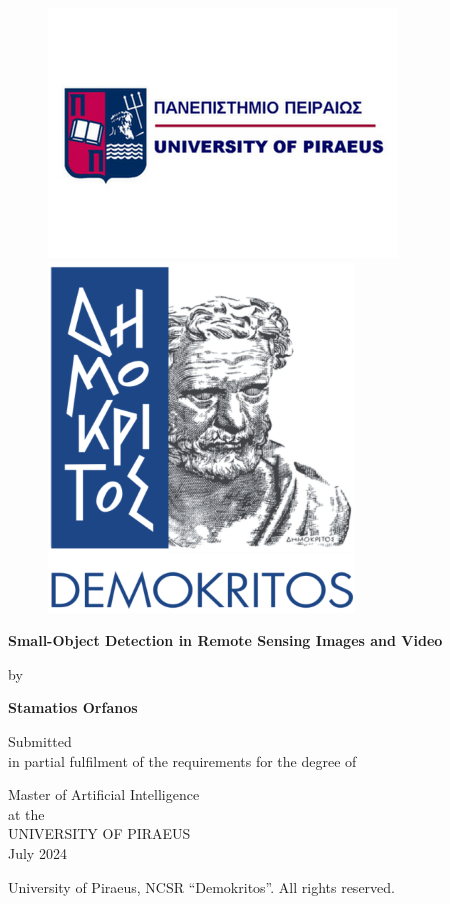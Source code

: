 \begin{titlepage}
    
    \begin{figure}[!h]
        \begin{minipage}{0.48\textwidth}
            \centering
            \includegraphics[width=0.8\linewidth]{Figures/University-of-Piraeus-logo-350x250.png}
        \end{minipage}
        \hfill
        \hfill
        \begin{minipage}{0.48\textwidth}
            \centering
            \includegraphics[width=.25\linewidth]{Figures/demokritos-logo.png}
        \end{minipage}
    \end{figure}

    \vspace{0.5in}


    \centering
    \textbf{\huge Small-Object Detection in Remote Sensing Images and Video}
    
    \vspace{0.2in}
    
    \large by

    \vspace{0.2in}

    \textbf{\Large Stamatios Orfanos}

    \vspace{0.4in}

    \large Submitted \\ in partial fulfilment of the requirements for the degree of 

    \vspace{0.2in}
    
    Master of Artificial Intelligence \\
    at the \\
    UNIVERSITY OF PIRAEUS \\
    July 2024
    
    \vspace{3.0in}
    
    \raggedright \small University of Piraeus, NCSR “Demokritos”. All rights reserved.
\end{titlepage}
